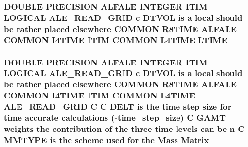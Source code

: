 \hypertarget{msa20_2home_2abonfi_2_c_f_d__codes_2_eul_f_s_83_82_83_2include_2time_8com_ac761db16f3bf53bd70f0a5b7409bb16f}{
\subsubsection[{L\-T\-I\-M\-E}]{\setlength{\rightskip}{0pt plus 5cm}D\-O\-U\-B\-L\-E P\-R\-E\-C\-I\-S\-I\-O\-N {\bf A\-L\-F\-A\-L\-E} I\-N\-T\-E\-G\-E\-R {\bf I\-T\-I\-M} L\-O\-G\-I\-C\-A\-L {\bf A\-L\-E\-\_\-\-R\-E\-A\-D\-\_\-\-G\-R\-I\-D} c {\bf D\-T\-V\-O\-L} is a local should be rather placed elsewhere C\-O\-M\-M\-O\-N R8\-T\-I\-M\-E {\bf A\-L\-F\-A\-L\-E} C\-O\-M\-M\-O\-N I4\-T\-I\-M\-E {\bf I\-T\-I\-M} C\-O\-M\-M\-O\-N L4\-T\-I\-M\-E L\-T\-I\-M\-E}}\label{msa20_2home_2abonfi_2_c_f_d__codes_2_eul_f_s_83_82_83_2include_2time_8com_ac761db16f3bf53bd70f0a5b7409bb16f}
\hypertarget{msa20_2home_2abonfi_2_c_f_d__codes_2_eul_f_s_83_82_83_2include_2time_8com_a4382c5f65146a9037561e7695675b6fd}{
\subsubsection[{Matrix}]{\setlength{\rightskip}{0pt plus 5cm}D\-O\-U\-B\-L\-E P\-R\-E\-C\-I\-S\-I\-O\-N {\bf A\-L\-F\-A\-L\-E} I\-N\-T\-E\-G\-E\-R {\bf I\-T\-I\-M} L\-O\-G\-I\-C\-A\-L {\bf A\-L\-E\-\_\-\-R\-E\-A\-D\-\_\-\-G\-R\-I\-D} c {\bf D\-T\-V\-O\-L} is a local should be rather placed elsewhere C\-O\-M\-M\-O\-N R8\-T\-I\-M\-E {\bf A\-L\-F\-A\-L\-E} C\-O\-M\-M\-O\-N I4\-T\-I\-M\-E {\bf I\-T\-I\-M} C\-O\-M\-M\-O\-N L4\-T\-I\-M\-E {\bf A\-L\-E\-\_\-\-R\-E\-A\-D\-\_\-\-G\-R\-I\-D} C C {\bf D\-E\-L\-T} is the time {\bf step} size for time accurate calculations (-\/time\-\_\-step\-\_\-size) C {\bf G\-A\-M\-T} weights the contribution of the three time levels can be {\bf n} C {\bf M\-M\-T\-Y\-P\-E} is the scheme {\bf used} for the Mass Matrix}}\label{msa20_2home_2abonfi_2_c_f_d__codes_2_eul_f_s_83_82_83_2include_2time_8com_a4382c5f65146a9037561e7695675b6fd}
